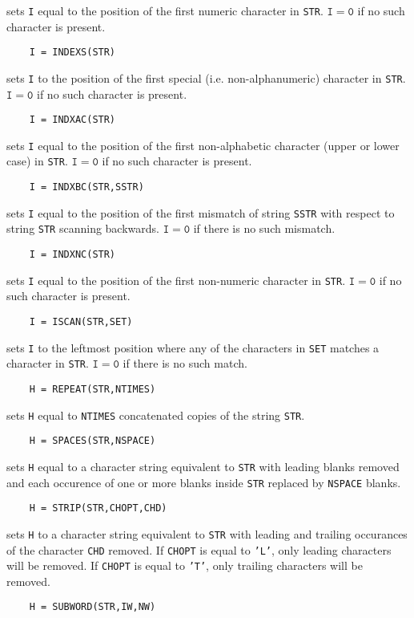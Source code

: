sets {\tt I} equal to the position of the first numeric character in
{\tt STR}. $\mathtt{I=0}$ if no such character is present.
\begin{verbatim}
    I = INDEXS(STR)
\end{verbatim}
sets {\tt I} to the position of the first special (i.e.
non-alphanumeric) character in {\tt STR}. $\mathtt{I=0}$ if no such
character is present.
\begin{verbatim}
    I = INDXAC(STR)
\end{verbatim}
sets {\tt I} equal to the position of the first non-alphabetic character
(upper or lower case) in {\tt STR}. $\mathtt{I=0}$ if no such character
is present.
\newpage
\begin{verbatim}
    I = INDXBC(STR,SSTR)
\end{verbatim}
sets {\tt I} equal to the position of the first mismatch of string
{\tt SSTR} with respect to string {\tt STR} scanning backwards.
$\mathtt{I=0}$ if there is no such mismatch.
\begin{verbatim}
    I = INDXNC(STR)
\end{verbatim}
sets {\tt I} equal to the position of the first non-numeric character
in {\tt STR}. $\mathtt{I=0}$ if no such character is present.
\begin{verbatim}
    I = ISCAN(STR,SET)
\end{verbatim}
sets {\tt I} to the leftmost position where any of
the characters in {\tt SET} matches a character in {\tt STR}.
$\mathtt{I=0}$ if there is no such match.
\begin{verbatim}
    H = REPEAT(STR,NTIMES)
\end{verbatim}
sets {\tt H} equal to {\tt NTIMES} concatenated copies of the
string {\tt STR}.
\begin{verbatim}
    H = SPACES(STR,NSPACE)
\end{verbatim}
sets {\tt H} equal to a character string equivalent to {\tt STR} with
leading blanks removed and each occurence of one or more blanks inside
{\tt STR} replaced by {\tt NSPACE} blanks.
\begin{verbatim}
    H = STRIP(STR,CHOPT,CHD)
\end{verbatim}
sets {\tt H} to a character string equivalent to {\tt STR}
with leading and trailing occurances of the character {\tt CHD}
removed.
If {\tt CHOPT} is equal to {\tt 'L'}, only leading
characters will be removed.
If {\tt CHOPT} is equal to {\tt 'T'}, only trailing
characters will be removed.
\begin{verbatim}
    H = SUBWORD(STR,IW,NW)
\end{verbatim}
